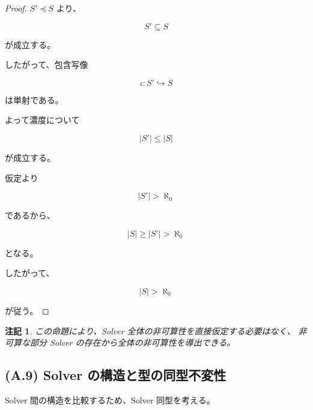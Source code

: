 \documentclass[a4paper,11pt]{article}
\newtheorem{remark}[definition]{注記}
\newcommand{\SubSolver}{\preceq}
\begin{document}
\begin{proof}
$S'\SubSolver S$ より、

\begin{equation}
    S'\subseteq S
\end{equation}

が成立する。

したがって、包含写像

\begin{equation}
    \iota:S'\hookrightarrow S
\end{equation}

は単射である。

よって濃度について

\begin{equation}
    |S'|\leq |S|
\end{equation}

が成立する。

仮定より

\begin{equation}
    |S'|>\aleph_0
\end{equation}

であるから、

\begin{equation}
    |S|
    \geq
    |S'|
    >
    \aleph_0
\end{equation}

となる。

したがって、

\begin{equation}
    |S|>\aleph_0
\end{equation}

が従う。
\end{proof}

\begin{remark}
この命題により、Solver 全体の非可算性を直接仮定する必要はなく、
非可算な部分 Solver の存在から全体の非可算性を導出できる。
\end{remark}


\subsection{(A.9) Solver の構造と型の同型不変性}
\label{subsec:A9}

Solver 間の構造を比較するため、Solver 同型を考える。
\end{document}
